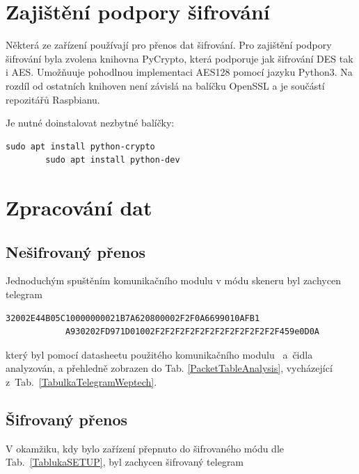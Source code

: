 \section{Zajištění podpory šifrování}
Některá ze zařízení používají pro přenos dat šifrování. Pro zajištění podpory šifrování byla zvolena knihovna PyCrypto, která podporuje jak šifrování DES tak i AES. 
Umožňuuje pohodlnou implementaci AES128 pomocí jazyku Python3. Na rozdíl od ostatních knihoven není závislá na balíčku OpenSSL a je součástí repozitářů Raspbianu. 

Je nutné doinstalovat nezbytné balíčky:	
 
\begin{lstlisting}[style=MyCodeBash]
		sudo apt install python-crypto
		sudo apt install python-dev
	\end{lstlisting}
	\vspace{-20pt}


\section{Zpracování dat}

\subsection{Nešifrovaný přenos}

Jednoduchým spuštěním komunikačního modulu v módu skeneru byl zachycen telegram

\begin{lstlisting}[style=MyCodePHP]
			32002E44B05C10000000021B7A620800002F2F0A6699010AFB1
			A930202FD971D01002F2F2F2F2F2F2F2F2F2F2F2F2F459e0D0A
\end{lstlisting}

který byl pomocí datasheetu použitého komunikačního modulu~\cite{ModulIQRF} a~čidla~\cite{CidloWeptech} analyzován, a přehledně zobrazen do Tab. \ref{PacketTableAnalysis}, vycházející z~Tab.~\ref{TabulkaTelegramWeptech}.

\subsection{Šifrovaný přenos}

V okamžiku, kdy bylo zařízení přepnuto do šifrovaného módu dle Tab.~\ref{TablukaSETUP}, byl zachycen šifrovaný telegram

